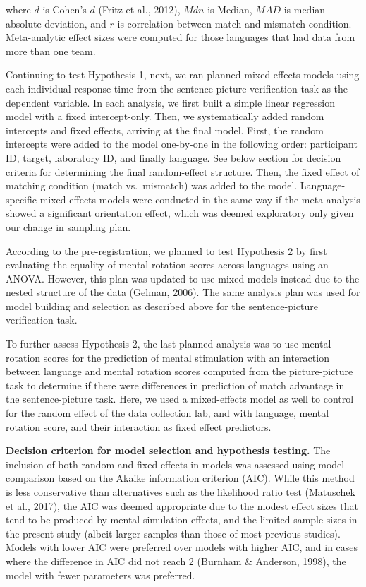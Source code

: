 \documentclass[
  man,floatsintext]{apa7}
\begin{document}
where \(d\) is Cohen's \(d\) (Fritz et al., 2012), \(Mdn\) is Median, \(MAD\) is median
absolute deviation, and \(r\) is correlation between match and mismatch
condition. Meta-analytic effect sizes were computed for those languages
that had data from more than one team.

Continuing to test Hypothesis 1, next, we ran planned mixed-effects
models using each individual response time from the sentence-picture
verification task as the dependent variable. In each analysis, we first
built a simple linear regression model with a fixed intercept-only.
Then, we systematically added random intercepts and fixed effects,
arriving at the final model. First, the random intercepts were added to
the model one-by-one in the following order: participant ID, target,
laboratory ID, and finally language. See below section for decision
criteria for determining the final random-effect structure. Then, the
fixed effect of matching condition (match vs.~mismatch) was added to the
model. Language-specific mixed-effects models were conducted in the same
way if the meta-analysis showed a significant orientation effect, which
was deemed exploratory only given our change in sampling plan.

According to the pre-registration, we planned to test Hypothesis 2 by
first evaluating the equality of mental rotation scores across languages
using an ANOVA. However, this plan was updated to use mixed models
instead due to the nested structure of the data (Gelman, 2006). The same
analysis plan was used for model building and selection as described
above for the sentence-picture verification task.

To further assess Hypothesis 2, the last planned analysis was to use
mental rotation scores for the prediction of mental stimulation with an
interaction between language and mental rotation scores computed from
the picture-picture task to determine if there were differences in
prediction of match advantage in the sentence-picture task. Here, we
used a mixed-effects model as well to control for the random effect of
the data collection lab, and with language, mental rotation score, and
their interaction as fixed effect predictors.

\textbf{Decision criterion for model selection and hypothesis testing.} The
inclusion of both random and fixed effects in models was assessed using
model comparison based on the Akaike information criterion (AIC). While
this method is less conservative than alternatives such as the
likelihood ratio test (Matuschek et al., 2017), the AIC was deemed appropriate
due to the modest effect sizes that tend to be produced by mental
simulation effects, and the limited sample sizes in the present study
(albeit larger samples than those of most previous studies). Models with
lower AIC were preferred over models with higher AIC, and in cases where
the difference in AIC did not reach 2 (Burnham \& Anderson, 1998), the model with
fewer parameters was preferred.
\end{document}
